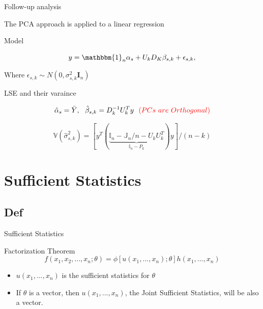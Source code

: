 \documentclass[ignorenonframetext,]{beamer}
\providecommand{\tightlist}{%
  \setlength{\itemsep}{0pt}\setlength{\parskip}{0pt}}
\begin{document}
\begin{frame}{Follow-up analysis}

The PCA approach is applied to a linear regression

\begin{block}{Model}

\[
  y = \mathbbm{1}_{n}\alpha_s + U_kD_K\beta_{s,k} + \epsilon_{s,k},
\]

Where \(\epsilon_{s,k} \sim N(0, \sigma^2_{s,k}\pmb{I}_n)\)

\end{block}

\begin{block}{LSE and their varaince}

\[
  \hat{\alpha}_s = \bar{Y},~~ \hat{\beta}_{s,k} = D_k^{-1}U_k^Ty  ~~\textcolor{red}{(PCs~are~ Orthogonal)}
\]

\[
  \mathbb{V}(\hat{\sigma}_{s,k}^2) = [y^T(\underbrace{\mathbb{I}_n - \mathbb{J}_n/n - U_kU_k^T}_{\mathbb{I}_n - P_k})y]/(n-k)
\]

\end{block}

\end{frame}

\section{Sufficient Statistics}\label{sufficient-statistics}

\subsection{Def}\label{def}

\begin{frame}{Sufficient Statistics}

\begin{block}{Factorization Theorem}
\[
  f(x_1, x_2, ... , x_n;\theta) =\phi\left[u(x_1, ... , x_n);\theta \right] h(x_1, ... , x_n)
\]

\end{block}

\begin{itemize}
\tightlist
\item
  \(u(x_1, ... , x_n)\) is the sufficient statistics for \(\theta\)
\item
  If \(\theta\) is a vector, then \(u(x_1, ... , x_n)\), the Joint
  Sufficient Statistics, will be also a vector.
\end{itemize}

\end{frame}
\end{document}

